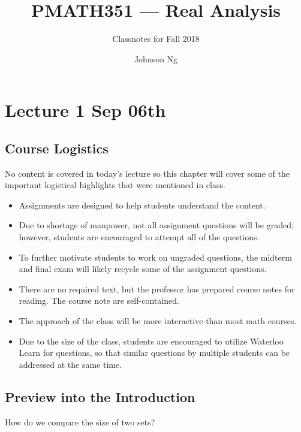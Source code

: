 \documentclass[notoc,notitlepage]{tufte-book}
\title{PMATH351 --- Real Analysis}
\author{Johnson Ng}
\subtitle{Classnotes for Fall 2018}
\begin{document}

\nocite{bforres2018}

\chapter{Lecture 1 Sep 06th}%
\label{chp:lecture_1_sep_06th}

\section{Course Logistics}%
\label{sec:course_logistics}

No content is covered in today's lecture so this chapter will cover some of the important logistical highlights that were mentioned in class.

\begin{itemize}
  \item Assignments are designed to help students understand the content.
  \item Due to shortage of manpower, not all assignment questions will be graded; however, students are encouraged to attempt all of the questions.
  \item To further motivate students to work on ungraded questions, the midterm and final exam will likely recycle some of the assignment questions.
  \item There are no required text, but the professor has prepared course notes for reading. The course note are self-contained.
  \item The approach of the class will be more interactive than most math courses.
  \item Due to the size of the class, students are encouraged to utilize Waterloo Learn for questions, so that similar questions by multiple students can be addressed at the same time.
\end{itemize}


\section{Preview into the Introduction}%
\label{sec:preview_into_the_introduction}

How do we compare the size of two sets?
\end{document}
